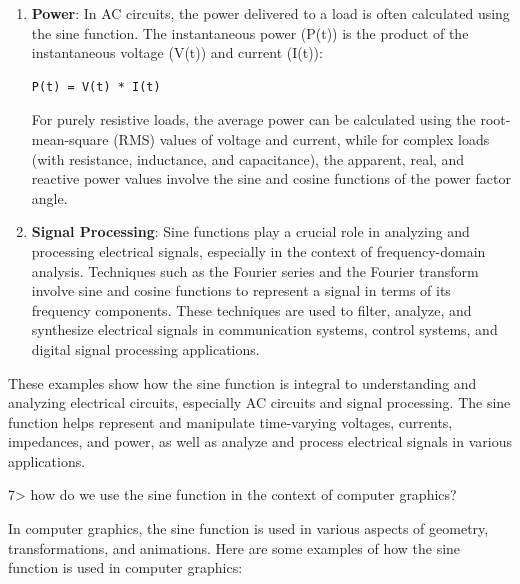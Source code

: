 \documentclass[
]{article}
\begin{document}
\begin{enumerate}
\begin{verbatim}
Z_L = jωL = j2πfL
Z_C = -j/(ωC) = -j/(2πfC)
\end{verbatim}

  Here, ω = 2πf is the angular frequency, L and C represent the
  inductance and capacitance, respectively.
\item
  \textbf{Power}: In AC circuits, the power delivered to a load is often
  calculated using the sine function. The instantaneous power (P(t)) is
  the product of the instantaneous voltage (V(t)) and current (I(t)):

\begin{verbatim}
P(t) = V(t) * I(t)
\end{verbatim}

  For purely resistive loads, the average power can be calculated using
  the root-mean-square (RMS) values of voltage and current, while for
  complex loads (with resistance, inductance, and capacitance), the
  apparent, real, and reactive power values involve the sine and cosine
  functions of the power factor angle.
\item
  \textbf{Signal Processing}: Sine functions play a crucial role in
  analyzing and processing electrical signals, especially in the context
  of frequency-domain analysis. Techniques such as the Fourier series
  and the Fourier transform involve sine and cosine functions to
  represent a signal in terms of its frequency components. These
  techniques are used to filter, analyze, and synthesize electrical
  signals in communication systems, control systems, and digital signal
  processing applications.
\end{enumerate}

These examples show how the sine function is integral to understanding
and analyzing electrical circuits, especially AC circuits and signal
processing. The sine function helps represent and manipulate
time-varying voltages, currents, impedances, and power, as well as
analyze and process electrical signals in various applications.

7\textgreater{} how do we use the sine function in the context of
computer graphics?

In computer graphics, the sine function is used in various aspects of
geometry, transformations, and animations. Here are some examples of how
the sine function is used in computer graphics:
\end{document}
